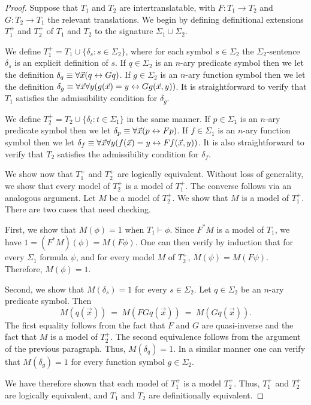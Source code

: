 \begin{proof} Suppose that $T_1$ and $T_2$ are intertranslatable, with
  $F:T_1\rightarrow T_2$ and $G:T_2\rightarrow T_1$ the relevant
  translations.  We begin by defining definitional extensions $T_1^+$
  and $T_2^+$ of $T_1$ and $T_2$ to the signature
  $\Sigma_1\cup\Sigma_2$.

  We define $T_1^+=T_1\cup \{\delta_s: s\in\Sigma_2\}$, where for each
  symbol $s\in \Sigma_2$ the $\Sigma_2$-sentence $\delta_s$ is an
  explicit definition of $s$.  If $q\in \Sigma_2$ is an $n$-ary
  predicate symbol then we let the definition
  $\delta_q\equiv \forall\vec{x}(q\leftrightarrow Gq)$. If $g\in \Sigma_2$ is an
  $n$-ary function symbol then we let the definition
  $\delta_g\equiv \forall\vec{x}\forall y(g(\vec{x})=y\leftrightarrow
  Gg(\vec{x},y))$. It is straightforward to verify that $T_1$
  satisfies the admissibility condition for $\delta_g$.
  
  We define $T_2^+=T_2\cup \{\delta_t: t\in\Sigma_1\}$ in the same
  manner. If $p\in \Sigma_1$ is an $n$-ary predicate symbol then we
  let $\delta_p\equiv \forall \vec{x}(p\leftrightarrow Fp)$.  If $f\in \Sigma_1$
  is an $n$-ary function symbol then we let
  $\delta_f\equiv \forall\vec{x}\forall y(f(\vec{x})=y\leftrightarrow
  Ff(\vec{x},y))$.  It is also straightforward to verify that $T_2$
  satisfies the admissibility condition for $\delta_f$.

  We show now that $T_1^+$ and $T_2^+$ are logically
  equivalent. Without loss of generality, we show that every model of
  $T_2^+$ is a model of $T_1^+$. The converse follows via an analogous
  argument. Let $M$ be a model of $T_2^+$. We show that $M$ is a model
  of $T_1^+$. There are two cases that need checking.

  First, we show that $M(\phi )=1$ when $T_1\vdash \phi$.  Since
  $F^*M$ is a model of $T_1$, we have $1=(F^*M)(\phi )=M(F\phi )$.
  One can then verify by induction that for every $\Sigma _1$ formula
  $\psi$, and for every model $M$ of $T_2^+$, $M(\psi )=M(F\psi )$.
  Therefore, $M(\phi )=1$.

  Second, we show that $M(\delta _s)=1$ for every $s\in\Sigma_2$. Let
  $q\in \Sigma_2$ be an $n$-ary predicate symbol.  Then
  \[ M(q(\vec{x})) \: =\: M(FGq(\vec{x})) \: = \: M(Gq(\vec{x})) .\]
  The first equality follows from the fact that $F$ and $G$ are
  quasi-inverse and the fact that $M$ is a model of $T_2^+$. The
  second equivalence follows from the argument of the previous
  paragraph.  Thus, $M(\delta _q)=1$.  In a similar manner one can
  verify that $M(\delta _g)=1$ for every function symbol
  $g\in \Sigma_2$.

  We have therefore shown that each model of $T_1^+$ is a model
  $T_2^+$.  Thus, $T_1^+$ and $T_2^+$ are logically equivalent, and
  $T_1$ and $T_2$ are definitionally equivalent.
\end{proof}


